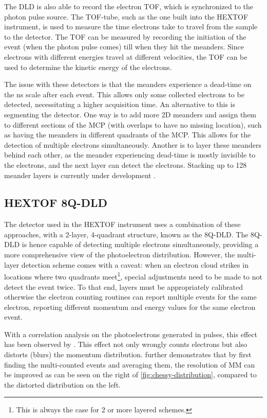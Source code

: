 The \gls{DLD} is also able to record the electron \gls{TOF}, which is synchronized to the photon pulse source. The \gls{TOF}-tube, such as the one built into the \gls{HEXTOF} instrument, is used to measure the time electrons take to travel from the sample to the detector. The \gls{TOF} can be measured by recording the initiation of the event (when the photon pulse comes) till when they hit the meanders. Since electrons with different energies travel at different velocities, the \gls{TOF} can be used to determine the kinetic energy of the electrons.

The issue with these detectors is that the meanders experience a dead-time on the \unit{ns} scale after each event. This allows only some collected electrons to be detected, necessitating a higher acquisition time. An alternative to this is segmenting the detector. One way is to add more 2D meanders and assign them to different sections of the \gls{MCP} (with overlaps to have no missing location), such as having the meanders in different quadrants of the \gls{MCP}. This allows for the detection of multiple electrons simultaneously. Another is to layer these meanders behind each other, as the meander experiencing dead-time is mostly invisible to the electrons, and the next layer can detect the electrons. Stacking up to \num{128} meander layers is currently under development \cite{oelsnerTimeEnergyResolved2010}.

\subsection*{HEXTOF 8Q-DLD}
The detector used in the \gls{HEXTOF} instrument uses a combination of these approaches, with a 2-layer, 4-quadrant structure, known as the 8Q-DLD. The 8Q-DLD is hence capable of detecting multiple electrons simultaneously, providing a more comprehensive view of the photoelectron distribution. However, the multi-layer detection scheme comes with a caveat: when an electron cloud strikes in locations where two quadrants meet\footnote{This is always the case for 2 or more layered schemes.}, special adjustments need to be made to not detect the event twice. To that end, layers must be appropriately calibrated otherwise the electron counting routines can report multiple events for the same electron, reporting different momentum and energy values for the same electron event. 

With a correlation analysis on the photoelectrons generated in pulses, this effect has been observed by \citeauthor{heberStudiesUltrafastDynamics2024} \cite{heberStudiesUltrafastDynamics2024}. This effect not only wrongly counts electrons but also distorts (blurs) the momentum distribution. \citeauthor{heberStudiesUltrafastDynamics2024} further demonstrates that by first finding the multi-counted events and averaging them, the resolution of \gls{MM} can be improved as can be seen on the right of \cref{fig:chessy-distribution}, compared to the distorted distribution on the left.

